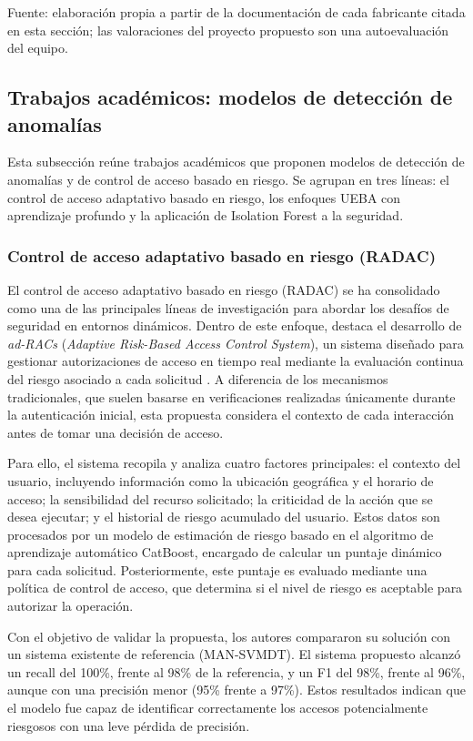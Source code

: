 {\small Fuente: elaboración propia a partir de la documentación de cada fabricante citada en esta sección; las valoraciones del proyecto propuesto son una autoevaluación del equipo.\par}

\subsection{Trabajos académicos: modelos de detección de anomalías}

Esta subsección reúne trabajos académicos que proponen modelos de detección de anomalías y de control de acceso basado en riesgo. Se agrupan en tres líneas: el control de acceso adaptativo basado en riesgo, los enfoques UEBA con aprendizaje profundo y la aplicación de Isolation Forest a la seguridad.

\subsubsection{Control de acceso adaptativo basado en riesgo (RADAC)}\label{sec:ea-radac}
El control de acceso adaptativo basado en riesgo (RADAC) se ha consolidado como una de las principales líneas de investigación para abordar los desafíos de seguridad en entornos dinámicos. Dentro de este enfoque, destaca el desarrollo de \emph{ad-RACs} (\emph{Adaptive Risk-Based Access Control System}), un sistema diseñado para gestionar autorizaciones de acceso en tiempo real mediante la evaluación continua del riesgo asociado a cada solicitud \parencite{Aliyu2024}. A diferencia de los mecanismos tradicionales, que suelen basarse en verificaciones realizadas únicamente durante la autenticación inicial, esta propuesta considera el contexto de cada interacción antes de tomar una decisión de acceso.

Para ello, el sistema recopila y analiza cuatro factores principales: el contexto del usuario, incluyendo información como la ubicación geográfica y el horario de acceso; la sensibilidad del recurso solicitado; la criticidad de la acción que se desea ejecutar; y el historial de riesgo acumulado del usuario. Estos datos son procesados por un modelo de estimación de riesgo basado en el algoritmo de aprendizaje automático CatBoost, encargado de calcular un puntaje dinámico para cada solicitud. Posteriormente, este puntaje es evaluado mediante una política de control de acceso, que determina si el nivel de riesgo es aceptable para autorizar la operación.

Con el objetivo de validar la propuesta, los autores compararon su solución con un sistema existente de referencia (MAN-SVMDT). El sistema propuesto alcanzó un recall del 100\%, frente al 98\% de la referencia, y un F1 del 98\%, frente al 96\%, aunque con una precisión menor (95\% frente a 97\%). Estos resultados indican que el modelo fue capaz de identificar correctamente los accesos potencialmente riesgosos con una leve pérdida de precisión.

